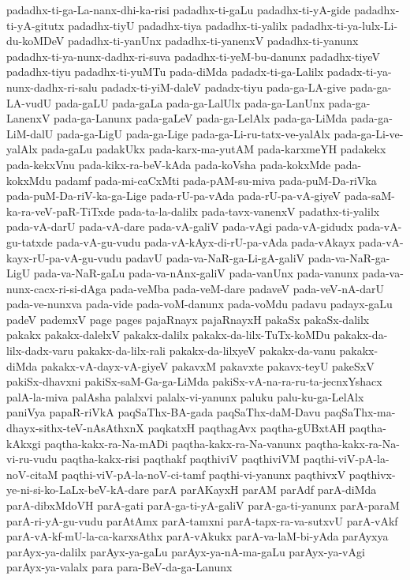 {padadhx-ti-ga-La-nanx-dhi-ka-risi
padadhx-ti-gaLu
padadhx-ti-yA-gide
padadhx-ti-yA-gitutx
padadhx-tiyU
padadhx-tiya
padadhx-ti-yalilx
padadhx-ti-ya-lulx-Li-du-koMDeV
padadhx-ti-yanUnx
padadhx-ti-yanenxV
padadhx-ti-yanunx
padadhx-ti-ya-nunx-dadhx-ri-suva
padadhx-ti-yeM-bu-danunx
padadhx-tiyeV
padadhx-tiyu
padadhx-ti-yuMTu
pada-diMda
padadx-ti-ga-Lalilx
padadx-ti-ya-nunx-dadhx-ri-salu
padadx-ti-yiM-daleV
padadx-tiyu
pada-ga-LA-give
pada-ga-LA-vudU
pada-gaLU
pada-gaLa
pada-ga-LalUlx
pada-ga-LanUnx
pada-ga-LanenxV
pada-ga-Lanunx
pada-gaLeV
pada-ga-LelAlx
pada-ga-LiMda
pada-ga-LiM-dalU
pada-ga-LigU
pada-ga-Lige
pada-ga-Li-ru-tatx-ve-yalAlx
pada-ga-Li-ve-yalAlx
pada-gaLu
padakUkx
pada-karx-ma-yutAM
pada-karxmeYH
padakekx
pada-kekxVnu
pada-kikx-ra-beV-kAda
pada-koVsha
pada-kokxMde
pada-kokxMdu
padamf
pada-mi-caCxMti
pada-pAM-su-miva
pada-puM-Da-riVka
pada-puM-Da-riV-ka-ga-Lige
pada-rU-pa-vAda
pada-rU-pa-vA-giyeV
pada-saM-ka-ra-veV-paR-TiTxde
pada-ta-la-dalilx
pada-tavx-vanenxV
padathx-ti-yalilx
pada-vA-darU
pada-vA-dare
pada-vA-galiV
pada-vAgi
pada-vA-gidudx
pada-vA-gu-tatxde
pada-vA-gu-vudu
pada-vA-kAyx-di-rU-pa-vAda
pada-vAkayx
pada-vA-kayx-rU-pa-vA-gu-vudu
padavU
pada-va-NaR-ga-Li-gA-galiV
pada-va-NaR-ga-LigU
pada-va-NaR-gaLu
pada-va-nAnx-galiV
pada-vanUnx
pada-vanunx
pada-va-nunx-cacx-ri-si-dAga
pada-veMba
pada-veM-dare
padaveV
pada-veV-nA-darU
pada-ve-nunxva
pada-vide
pada-voM-danunx
pada-voMdu
padavu
padayx-gaLu
padeV
pademxV
page
pages
pajaRnayx
pajaRnayxH
pakaSx
pakaSx-dalilx
pakakx
pakakx-dalelxV
pakakx-dalilx
pakakx-da-lilx-TuTx-koMDu
pakakx-da-lilx-dadx-varu
pakakx-da-lilx-rali
pakakx-da-lilxyeV
pakakx-da-vanu
pakakx-diMda
pakakx-vA-dayx-vA-giyeV
pakavxM
pakavxte
pakavx-teyU
pakeSxV
pakiSx-dhavxni
pakiSx-saM-Ga-ga-LiMda
pakiSx-vA-na-ra-ru-ta-jecnxYshacx
palA-la-miva
palAsha
palalxvi
palalx-vi-yanunx
paluku
palu-ku-ga-LelAlx
paniVya
papaR-riVkA
paqSaThx-BA-gada
paqSaThx-daM-Davu
paqSaThx-ma-dhayx-sithx-teV-nAsAthxnX
paqkatxH
paqthagAvx
paqtha-gUBxtAH
paqtha-kAkxgi
paqtha-kakx-ra-Na-mADi
paqtha-kakx-ra-Na-vanunx
paqtha-kakx-ra-Na-vi-ru-vudu
paqtha-kakx-risi
paqthakf
paqthiviV
paqthiviVM
paqthi-viV-pA-la-noV-citaM
paqthi-viV-pA-la-noV-ci-tamf
paqthi-vi-yanunx
paqthivxV
paqthivx-ye-ni-si-ko-LaLx-beV-kA-dare
parA
parAKayxH
parAM
parAdf
parA-diMda
parA-dibxMdoVH
parA-gati
parA-ga-ti-yA-galiV
parA-ga-ti-yanunx
parA-paraM
parA-ri-yA-gu-vudu
parAtAmx
parA-tamxni
parA-tapx-ra-va-sutxvU
parA-vAkf
parA-vA-kf-mU-la-ca-karxsAthx
parA-vAkukx
parA-va-laM-bi-yAda
parAyxya
parAyx-ya-dalilx
parAyx-ya-gaLu
parAyx-ya-nA-ma-gaLu
parAyx-ya-vAgi
parAyx-ya-valalx
para
para-BeV-da-ga-Lanunx
}
